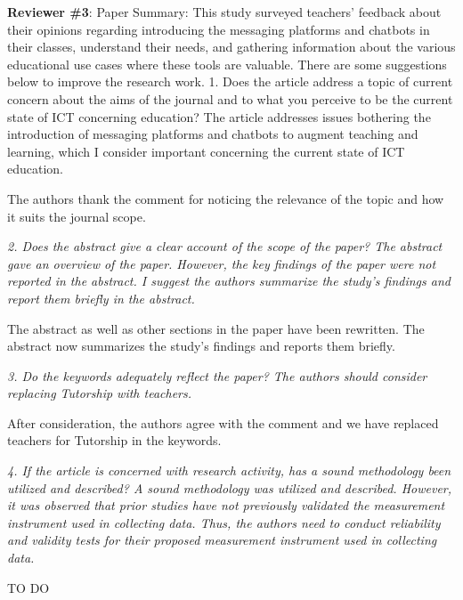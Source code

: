 \documentclass{letter}
\begin{document}

{\it

{\bf Reviewer \#3}: Paper Summary:
This study surveyed teachers' feedback about their opinions regarding introducing the messaging platforms and chatbots in their classes, understand their needs, and gathering information about the various educational use cases where these tools are valuable. There are some suggestions below to improve the research work.
1.      Does the article address a topic of current concern about the aims of the journal and to what you perceive to be the current state of ICT concerning education? The article addresses issues bothering the introduction of messaging platforms and chatbots to augment teaching and learning, which I consider important concerning the current state of ICT education.}


The authors thank the comment for noticing the relevance of the topic and how it suits the journal scope.

{\it 2.      Does the abstract give a clear account of the scope of the paper? The abstract gave an overview of the paper. However, the key findings of the paper were not reported in the abstract. I suggest the authors summarize the study's findings and report them briefly in the abstract.}


The abstract as well as other sections in the paper have been rewritten. The abstract now summarizes the study's findings and reports them briefly.


{\it 3.      Do the keywords adequately reflect the paper? The authors should consider replacing Tutorship with teachers.}

After consideration, the authors agree with the comment and we have replaced teachers for Tutorship in the keywords.


{\it 4.      If the article is concerned with research activity, has a sound methodology been utilized and described? A sound methodology was utilized and described. However, it was observed that prior studies have not previously validated the measurement instrument used in collecting data. Thus, the authors need to conduct reliability and validity tests for their proposed measurement instrument used in collecting data.}

TO DO

\end{document}
